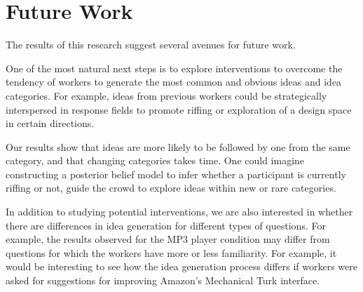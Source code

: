 \section{Future Work}

The results of this research suggest several avenues for future work.

One of the most natural next steps is to explore interventions to overcome the tendency of workers to generate the most common and obvious ideas and idea categories. For example, ideas from previous workers could be strategically interspersed in response fields to promote riffing or exploration of a design space in certain directions. 

Our results show that ideas are more likely to be followed by one from the same category, and that changing categories takes time. One could imagine constructing a posterior belief model to infer whether a participant is currently riffing or not, guide the crowd to explore ideas within new or rare categories.

In addition to studying potential interventions, we are also interested in whether there are differences in idea generation for different types of questions. For example, the results observed for the MP3 player condition may differ from questions for which the workers have more or less familiarity. For example, it would be interesting to see how the idea generation process differs if workers were asked for suggestions for improving Amazon's Mechanical Turk interface.







